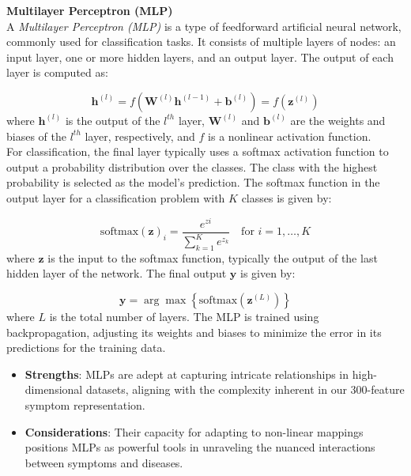 \noindent
\vspace{0.3cm}
\textbf{Multilayer Perceptron (MLP)}\vspace{0.15cm}\\
A \textit{Multilayer Perceptron (MLP)} is a type of feedforward artificial neural network, commonly used for classification tasks. It consists of multiple layers of nodes: an input layer, one or more hidden layers, and an output layer. The output of each layer is computed as:

\begin{equation}
	\mathbf{h}^{(l)} = f(\mathbf{W}^{(l)} \mathbf{h}^{(l-1)} + \mathbf{b}^{(l)}) = f(\mathbf{z}^{(l)})
\end{equation}
\noindent
where $\mathbf{h}^{(l)}$ is the output of the $l^{th}$ layer, $\mathbf{W}^{(l)}$ and $\mathbf{b}^{(l)}$ are the weights and biases of the $l^{th}$ layer, respectively, and $f$ is a nonlinear activation function.\\
For classification, the final layer typically uses a softmax activation function to output a probability distribution over the classes. The class with the highest probability is selected as the model's prediction. The softmax function in the output layer for a classification problem with $K$ classes is given by:

\begin{equation}
	\text{softmax}(\mathbf{z})_i = \frac{e^{zi}}{\sum_{k=1}^{K} e^{z_k}} \quad \text{for } i = 1, \ldots, K
\end{equation}
\noindent
where $\mathbf{z}$ is the input to the softmax function, typically the output of the last hidden layer of the network. The final output $\mathbf{y}$ is given by:

\begin{equation}
	\mathbf{y} = \arg\max \left\{ \text{softmax}(\mathbf{z}^{(L)}) \right\}
\end{equation}
\noindent
where $L$ is the total number of layers. The MLP is trained using backpropagation, adjusting its weights and biases to minimize the error in its predictions for the training data.

\begin{itemize}
	\item \textbf{Strengths}: MLPs are adept at capturing intricate relationships in high-dimensional datasets,
	      aligning with the complexity inherent in our 300-feature symptom representation.
	\item \textbf{Considerations}: Their capacity for adapting to non-linear mappings positions MLPs as powerful
	      tools in unraveling the nuanced interactions between symptoms and diseases.
\end{itemize}



